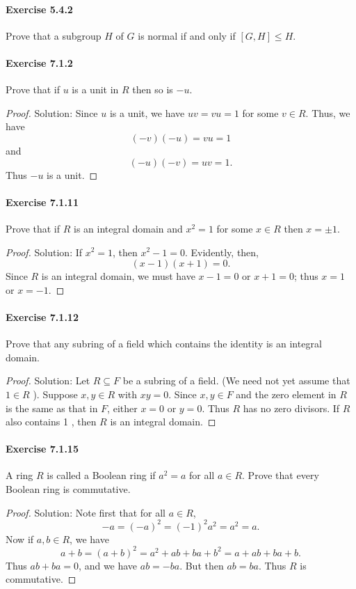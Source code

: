 \documentclass{article}
\theoremstyle{definition}
\begin{document}
\paragraph{Exercise 5.4.2} Prove that a subgroup $H$ of $G$ is normal if and only if $[G, H] \leq H$.

\paragraph{Exercise 7.1.2} Prove that if $u$ is a unit in $R$ then so is $-u$.
\begin{proof}
    Solution: Since $u$ is a unit, we have $u v=v u=1$ for some $v \in R$. Thus, we have
$$
(-v)(-u)=v u=1
$$
and
$$
(-u)(-v)=u v=1 .
$$
Thus $-u$ is a unit.
\end{proof}


\paragraph{Exercise 7.1.11} Prove that if $R$ is an integral domain and $x^{2}=1$ for some $x \in R$ then $x=\pm 1$.
\begin{proof}
    Solution: If $x^2=1$, then $x^2-1=0$. Evidently, then,
$$
(x-1)(x+1)=0 .
$$
Since $R$ is an integral domain, we must have $x-1=0$ or $x+1=0$; thus $x=1$ or $x=-1$.
\end{proof}


\paragraph{Exercise 7.1.12} Prove that any subring of a field which contains the identity is an integral domain.
\begin{proof}
    Solution: Let $R \subseteq F$ be a subring of a field. (We need not yet assume that $1 \in R$ ). Suppose $x, y \in R$ with $x y=0$. Since $x, y \in F$ and the zero element in $R$ is the same as that in $F$, either $x=0$ or $y=0$. Thus $R$ has no zero divisors. If $R$ also contains 1 , then $R$ is an integral domain.
\end{proof}


\paragraph{Exercise 7.1.15} A ring $R$ is called a Boolean ring if $a^{2}=a$ for all $a \in R$. Prove that every Boolean ring is commutative.
\begin{proof}
    Solution: Note first that for all $a \in R$,
$$
-a=(-a)^2=(-1)^2 a^2=a^2=a .
$$
Now if $a, b \in R$, we have
$$
a+b=(a+b)^2=a^2+a b+b a+b^2=a+a b+b a+b .
$$
Thus $a b+b a=0$, and we have $a b=-b a$. But then $a b=b a$. Thus $R$ is commutative.
\end{proof}
\end{document}
